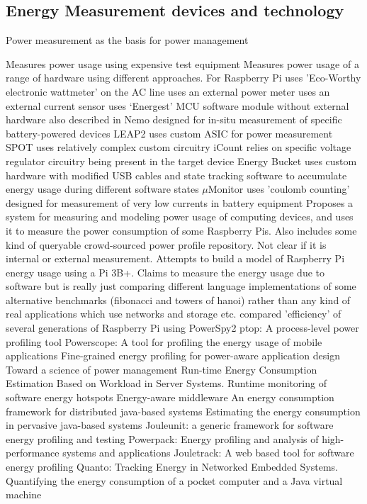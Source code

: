 \subsection{Energy Measurement devices and technology}

\citep{Snowdon2005} Power measurement as the basis for power management

\citep{Ardito2018} Measures power usage using expensive test equipment
\citep{Bekaroo2016} Measures power usage of a range of hardware using different approaches. For Raspberry Pi uses 'Eco-Worthy electronic wattmeter' on the AC line
\citep{Kaup2014} uses an external power meter
\citep{Astudillo-Salinas2016} uses an external current sensor
\citep{Sabovic2020} uses `Energest' MCU software module without external hardware also described in \citep{Dunkels2007}
\citep{Zhou2013a} Nemo designed for in-situ measurement of specific battery-powered devices
\citep{Stathopoulos2008} LEAP2 uses custom ASIC for power measurement
\citep{Jiang2007} SPOT uses relatively complex custom circuitry
\citep{Dutta2008} iCount relies on specific voltage regulator circuitry being present in the target device
\citep{Andersen2009} Energy Bucket uses custom hardware with modified USB cables and state tracking software to accumulate energy usage during different software states
\citep{Naderiparizi2016} $\mu$Monitor uses 'coulomb counting' designed for measurement of very low currents in battery equipment
\citep{Kanso2023} Proposes a system for measuring and modeling power usage of computing devices, and uses it to measure the power consumption of some Raspberry Pis. Also includes some kind of queryable crowd-sourced power profile repository. Not clear if it is internal or external measurement.
\citep{Kesrouani2020} Attempts to build a model of Raspberry Pi energy usage using a Pi 3B+. Claims to measure the energy usage due to software but is really just comparing different language implementations of some alternative benchmarks (fibonacci and towers of hanoi) rather than any kind of real applications which use networks and storage etc.
\citep{Kaup2018} compared 'efficiency' of several generations of Raspberry Pi using PowerSpy2
\citep{Do2009} ptop: A process-level power profiling tool
\citep{Flinn1999} Powerscope: A tool for profiling the energy usage of mobile applications
\citep{Kansal2008} Fine-grained energy profiling for power-aware application design
\citep{Kant2009} Toward a science of power management
\citep{Lewis2008} Run-time Energy Consumption Estimation Based on Workload in Server Systems.
\citep{Noureddine2012a} Runtime monitoring of software energy hotspots
\citep{Petre2008} Energy-aware middleware
\citep{Seo2007a} An energy consumption framework for distributed java-based systems
\citep{Seo2008} Estimating the energy consumption in pervasive java-based systems
\citep{Wilke2013} Jouleunit: a generic framework for software energy profiling and testing
\citep{Ge2009} Powerpack: Energy profiling and analysis of high-performance systems and applications
\citep{Sinha2001} Jouletrack: A web based tool for software energy profiling
\citep{Fonseca2008} Quanto: Tracking Energy in Networked Embedded Systems.
\citep{Farkas2000} Quantifying the energy consumption of a pocket computer and a Java virtual machine

